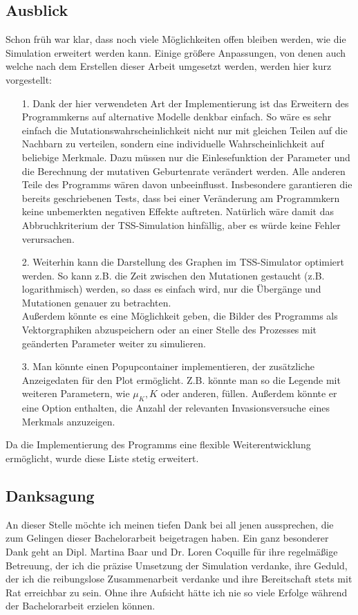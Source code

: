 \documentclass[11pt, a4paper, german]{article}
\theoremstyle{plain}
\begin{document}
\subsection{Ausblick}
Schon früh war klar, dass noch viele Möglichkeiten offen bleiben werden, wie die Simulation erweitert werden kann. Einige größere Anpassungen, von denen auch welche nach dem Erstellen dieser Arbeit umgesetzt werden, werden hier kurz vorgestellt:
\begin{itemize}
	\item[1.] Dank der hier verwendeten Art der Implementierung ist das Erweitern des Programmkerns auf alternative Modelle denkbar einfach. So wäre es sehr einfach die Mutationswahrscheinlichkeit nicht nur mit gleichen Teilen auf die Nachbarn zu verteilen, sondern eine individuelle Wahrscheinlichkeit auf beliebige Merkmale. Dazu müssen nur die Einlesefunktion der Parameter und die Berechnung der mutativen Geburtenrate verändert werden. Alle anderen Teile des Programms wären davon unbeeinflusst. Insbesondere garantieren die bereits geschriebenen Tests, dass bei einer Veränderung am Programmkern keine unbemerkten negativen Effekte auftreten. Natürlich wäre damit das Abbruchkriterium der TSS-Simulation hinfällig, aber es würde keine Fehler verursachen.
	\item[2.] Weiterhin kann die Darstellung des Graphen im TSS-Simulator optimiert werden. So kann z.B. die Zeit zwischen den Mutationen gestaucht (z.B. logarithmisch) werden, so dass es einfach wird, nur die Übergänge und Mutationen genauer zu betrachten. \\
	Außerdem könnte es eine Möglichkeit geben, die Bilder des Programms als Vektorgraphiken abzuspeichern oder an einer Stelle des Prozesses mit geänderten Parameter weiter zu simulieren.
	\item[3.] Man könnte einen Popupcontainer implementieren, der zusätzliche Anzeigedaten für den Plot ermöglicht. Z.B. könnte man so die Legende mit weiteren Parametern, wie $ \mu_K, K $ oder anderen, füllen. Außerdem könnte er eine Option enthalten, die Anzahl der relevanten Invasionsversuche eines Merkmals anzuzeigen.
\end{itemize}
Da die Implementierung des Programms eine flexible Weiterentwicklung ermöglicht, wurde diese Liste stetig erweitert.

\subsection{Danksagung}
An dieser Stelle möchte ich meinen tiefen Dank bei all jenen aussprechen, die zum Gelingen dieser Bachelorarbeit beigetragen haben. Ein ganz besonderer Dank geht an Dipl. Martina Baar und Dr. Loren Coquille für ihre regelmäßige Betreuung, der ich die präzise Umsetzung der Simulation verdanke, ihre Geduld, der ich die reibungslose Zusammenarbeit verdanke und ihre Bereitschaft stets mit Rat erreichbar zu sein. Ohne ihre Aufsicht hätte ich nie so viele Erfolge während der Bachelorarbeit erzielen können.

\clearpage

\end{document}
